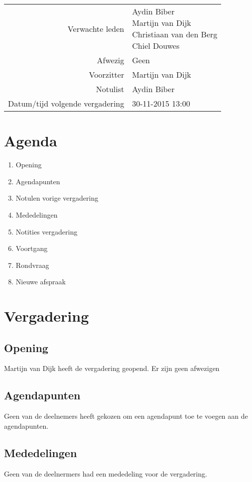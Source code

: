 \documentclass[dutch]{hu}
\subtitle{Notule 23-11-2015}
\begin{document}
\maketitle

\begin{tabular}{ r | l }
Verwachte leden & \makecell[l]{
	Aydin Biber \\
	Martijn van Dijk \\
	Christiaan van den Berg \\
	Chiel Douwes
	} \\
Afwezig & Geen \\
Voorzitter & Martijn van Dijk \\
Notulist & Aydin Biber \\
Datum/tijd volgende vergadering & 30-11-2015 13:00
\end{tabular}

\chapter{Agenda}
\begin{enumerate}
\item Opening
\item Agendapunten
\item Notulen vorige vergadering
\item Mededelingen
\item Notities vergadering
\item Voortgang
\item Rondvraag
\item Nieuwe afspraak
\end{enumerate}

\chapter{Vergadering}
\section{Opening}
Martijn van Dijk heeft de vergadering geopend. Er zijn geen afwezigen

\section{Agendapunten}
Geen van de deelnemers heeft gekozen om een agendapunt toe te voegen aan de agendapunten.

\section{Mededelingen}
Geen van de deelnermers had een mededeling voor de vergadering.
\end{document}
